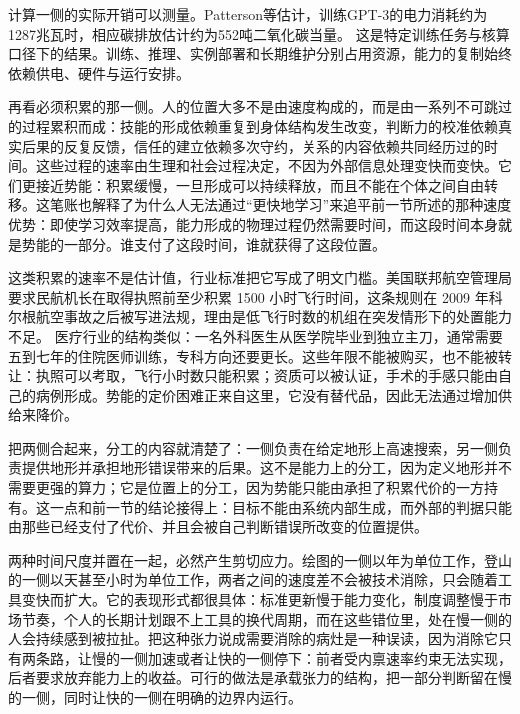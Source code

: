计算一侧的实际开销可以测量。Patterson等估计，训练GPT-3的电力消耗约为1287兆瓦时，相应碳排放估计约为552吨二氧化碳当量。\cite{patterson2021carbon} 这是特定训练任务与核算口径下的结果。训练、推理、实例部署和长期维护分别占用资源，能力的复制始终依赖供电、硬件与运行安排。


再看必须积累的那一侧。人的位置大多不是由速度构成的，而是由一系列不可跳过的过程累积而成：技能的形成依赖重复到身体结构发生改变，判断力的校准依赖真实后果的反复反馈，信任的建立依赖多次守约，关系的内容依赖共同经历过的时间。这些过程的速率由生理和社会过程决定，不因为外部信息处理变快而变快。它们更接近势能：积累缓慢，一旦形成可以持续释放，而且不能在个体之间自由转移。这笔账也解释了为什么人无法通过“更快地学习”来追平前一节所述的那种速度优势：即使学习效率提高，能力形成的物理过程仍然需要时间，而这段时间本身就是势能的一部分。谁支付了这段时间，谁就获得了这段位置。

这类积累的速率不是估计值，行业标准把它写成了明文门槛。美国联邦航空管理局要求民航机长在取得执照前至少积累 1500 小时飞行时间，这条规则在 2009 年科尔根航空事故之后被写进法规，理由是低飞行时数的机组在突发情形下的处置能力不足。\cite{faa2013atp} 医疗行业的结构类似：一名外科医生从医学院毕业到独立主刀，通常需要五到七年的住院医师训练，专科方向还要更长。这些年限不能被购买，也不能被转让：执照可以考取，飞行小时数只能积累；资质可以被认证，手术的手感只能由自己的病例形成。势能的定价困难正来自这里，它没有替代品，因此无法通过增加供给来降价。

把两侧合起来，分工的内容就清楚了：一侧负责在给定地形上高速搜索，另一侧负责提供地形并承担地形错误带来的后果。这不是能力上的分工，因为定义地形并不需要更强的算力；它是位置上的分工，因为势能只能由承担了积累代价的一方持有。这一点和前一节的结论接得上：目标不能由系统内部生成，而外部的判据只能由那些已经支付了代价、并且会被自己判断错误所改变的位置提供。


两种时间尺度并置在一起，必然产生剪切应力。绘图的一侧以年为单位工作，登山的一侧以天甚至小时为单位工作，两者之间的速度差不会被技术消除，只会随着工具变快而扩大。它的表现形式都很具体：标准更新慢于能力变化，制度调整慢于市场节奏，个人的长期计划跟不上工具的换代周期，而在这些错位里，处在慢一侧的人会持续感到被拉扯。把这种张力说成需要消除的病灶是一种误读，因为消除它只有两条路，让慢的一侧加速或者让快的一侧停下：前者受内禀速率约束无法实现，后者要求放弃能力上的收益。可行的做法是承载张力的结构，把一部分判断留在慢的一侧，同时让快的一侧在明确的边界内运行。


